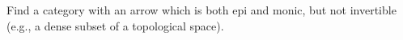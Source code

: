 Find a category with an arrow which is both epi and monic, but not invertible (e.g., a dense subset of a topological space).